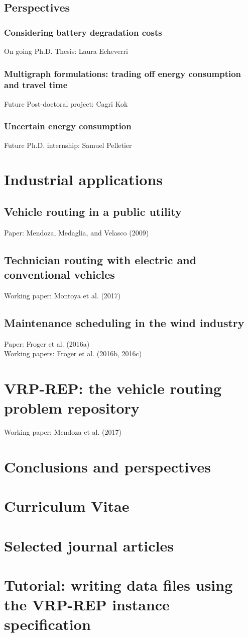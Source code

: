 \documentclass[10pt,a4paper]{book}
\begin{document}
  \section{Perspectives}
  \subsection{Considering battery degradation costs}
  	On going Ph.D. Thesis: Laura Echeverri
  \subsection{Multigraph formulations: trading off energy consumption and travel time}
  	Future Post-doctoral project: Cagri Kok
  \subsection{Uncertain energy consumption}
  	Future Ph.D. internship: Samuel Pelletier

\chapter{Industrial applications}
  \section{Vehicle routing in a public utility}
  Paper: Mendoza, Medaglia, and Velasco (2009)
  \section{Technician routing with electric and conventional vehicles}
  Working paper: Montoya et al. (2017)
  \section{Maintenance scheduling in the wind industry}
  Paper: Froger et al. (2016a)\\
  Working papers: Froger et al. (2016b, 2016c)

\chapter{VRP-REP: the vehicle routing problem repository}
Working paper: Mendoza et al. (2017)

\chapter{Conclusions and perspectives}

\begin{appendix}
\chapter{Curriculum Vitae}
\chapter{Selected journal articles}
\chapter{Tutorial: writing data files using the VRP-REP instance specification}
\end{appendix}
\end{document}
